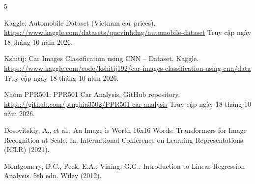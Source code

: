 \documentclass[runningheads]{llncs}
\begin{document}
\begin{thebibliography}{5}

    Kaggle: Automobile Dataset (Vietnam car prices).
    \url{https://www.kaggle.com/datasets/qucvinhdng/automobile-dataset}
    Truy cập ngày 18 tháng 10 năm 2026.

    Kshitij: Car Images Classification using CNN -- Dataset.
    Kaggle.
    \url{https://www.kaggle.com/code/kshitij192/car-images-classification-using-cnn/data}
    Truy cập ngày 18 tháng 10 năm 2026.

    Nhóm PPR501: PPR501 Car Analysis.
    GitHub repository.
    \url{https://github.com/ptnghia3502/PPR501-car-analysis}
    Truy cập ngày 18 tháng 10 năm 2026.

    Dosovitskiy, A., et al.:
    An Image is Worth 16x16 Words: Transformers for Image
    Recognition at Scale.
    In: International Conference on Learning Representations
    (ICLR) (2021).

    Montgomery, D.C., Peck, E.A., Vining, G.G.:
    Introduction to Linear Regression Analysis.
    5th edn. Wiley (2012).

\end{thebibliography}
\end{document}
